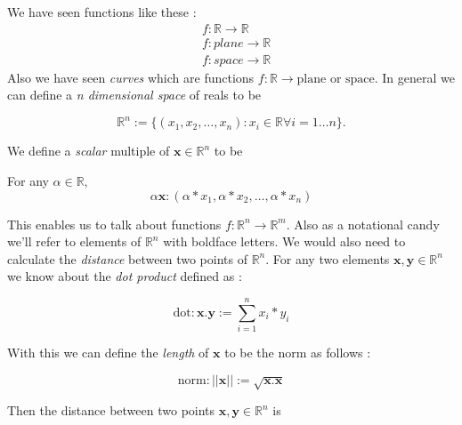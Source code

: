 We have seen functions like these :
\begin{displaymath}
    \begin{aligned}
	& f : \mathbb{R} \rightarrow \mathbb{R} \\
	& f : plane \rightarrow \mathbb{R} \\
	& f : space \rightarrow \mathbb{R}
    \end{aligned}
\end{displaymath}
Also we have seen \emph{curves} which are functions $f : \mathbb{R} \rightarrow \text{plane or
space} $. In general we can define a \emph{n dimensional space} 
 of reals to be 
\begin{Definition}
    \begin{displaymath}
	\mathbb{R}^n := \left.\lbrace (x_1, x_2, \dots, x_n) : x_i \in \mathbb{R} \forall i =
	    1\dots n \rbrace.\right.
    \end{displaymath}
\end{Definition}  
We define a \emph{scalar} multiple of $\mathbf{x} \in \mathbb{R}^n$ to be 
\begin{Definition}
    For any $\alpha \in \mathbb{R}$,
    \begin{displaymath}
	\alpha\mathbf{x} : (\alpha*x_1, \alpha*x_2, \dots, \alpha*x_n)
    \end{displaymath}
\end{Definition}
This enables us to talk about functions $f :  \mathbb{R}^n \rightarrow  \mathbb{R}^m $. Also as
a notational candy we'll refer to elements of $ \mathbb{R}^n$ with boldface letters. We would also 
need to calculate the \emph{distance} between two points of  $\mathbb{R}^n$. For any two elements
$ \mathbf{x},\mathbf{y} \in \mathbb{R}^n$ we know about the \emph{dot product} defined as :
\begin{Definition}
    \begin{displaymath}
	\text{dot}: \mathbf{x} . \mathbf{y} := \sum_{i=1}^{n} x_i*y_i
    \end{displaymath}
\end{Definition}
With this we can define the \emph{length} of $\mathbf{x}$ to be the norm as follows :
\begin{Definition}
    \begin{displaymath}
	\text{norm}: \lvert \lvert \mathbf{x} \rvert \rvert := \sqrt{\mathbf{x} . \mathbf{x}}
    \end{displaymath}
\end{Definition}
Then the distance between two points $\mathbf{x},\mathbf{y} \in \mathbb{R}^n$ is 
